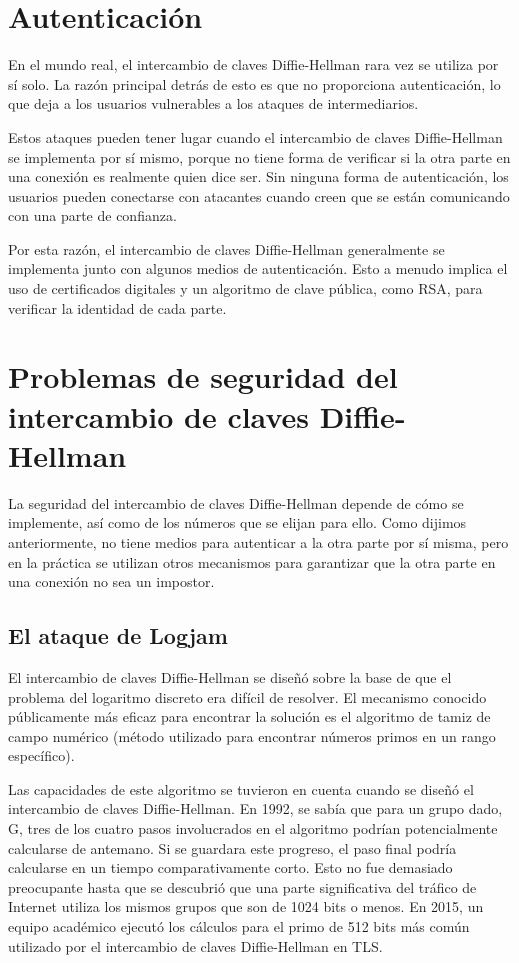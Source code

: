 \documentclass[11pt]{article}
\begin{document}
\section{Autenticación}

En el mundo real, el intercambio de claves Diffie-Hellman rara vez se utiliza por sí solo. La razón principal detrás de esto es que no proporciona autenticación, lo que deja a los usuarios vulnerables a los ataques de intermediarios.

Estos ataques pueden tener lugar cuando el intercambio de claves Diffie-Hellman se implementa por sí mismo, porque no tiene forma de verificar si la otra parte en una conexión es realmente quien dice ser. Sin ninguna forma de autenticación, los usuarios pueden conectarse con atacantes cuando creen que se están comunicando con una parte de confianza.

Por esta razón, el intercambio de claves Diffie-Hellman generalmente se implementa junto con algunos medios de autenticación. Esto a menudo implica el uso de certificados digitales y un algoritmo de clave pública, como RSA, para verificar la identidad de cada parte.


\section{Problemas de seguridad del intercambio de claves Diffie-Hellman}
La seguridad del intercambio de claves Diffie-Hellman depende de cómo se implemente, así como de los números que se elijan para ello. Como dijimos anteriormente, no tiene medios para autenticar a la otra parte por sí misma, pero en la práctica se utilizan otros mecanismos para garantizar que la otra parte en una conexión no sea un impostor.

\subsection {El ataque de Logjam}

El intercambio de claves Diffie-Hellman se diseñó sobre la base de que el problema del logaritmo discreto era difícil de resolver. El mecanismo conocido públicamente más eficaz para encontrar la solución es el algoritmo de tamiz de campo numérico (método utilizado para encontrar números primos en un rango específico).

Las capacidades de este algoritmo se tuvieron en cuenta cuando se diseñó el intercambio de claves Diffie-Hellman. En 1992, se sabía que para un grupo dado, G, tres de los cuatro pasos involucrados en el algoritmo podrían potencialmente calcularse de antemano. Si se guardara este progreso, el paso final podría calcularse en un tiempo comparativamente corto. Esto no fue demasiado preocupante hasta que se descubrió que una parte significativa del tráfico de Internet utiliza los mismos grupos que son de 1024 bits o menos. En 2015, un equipo académico ejecutó los cálculos para el primo de 512 bits más común utilizado por el intercambio de claves Diffie-Hellman en TLS.
\end{document}

